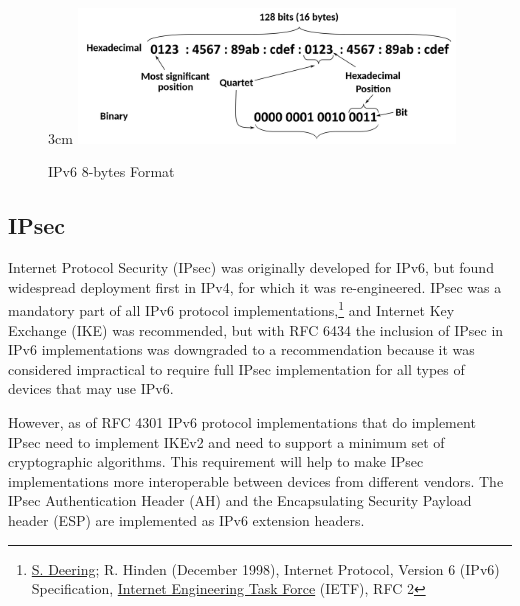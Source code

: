 \documentclass[a4paper,12pt]{book}
\begin{document}
\begin{figure}{3cm}
\centering
\includegraphics[width=10cm]{./IPv6.PNG}
\caption{IPv6 8-bytes Format }\label{wrap-fig:7}
\end{figure}


\subsection{IPsec}
Internet Protocol Security (IPsec) was originally developed for IPv6, but found widespread deployment first in IPv4, for which it was re-engineered. IPsec was a mandatory part of all IPv6 protocol implementations,\footnote{\label{note1}\href{https://en.wikipedia.org/wiki/Steve_Deering}{S. Deering}; R. Hinden (December 1998), Internet Protocol, Version 6 (IPv6) Specification, \href{https://en.wikipedia.org/wiki/Internet_Engineering_Task_Force}{Internet Engineering Task Force} (IETF), RFC 2} and Internet Key Exchange (IKE) was recommended, but with RFC 6434 the inclusion of IPsec in IPv6 implementations was downgraded to a recommendation because it was considered impractical to require full IPsec implementation for all types of devices that may use IPv6.

However, as of RFC 4301 IPv6 protocol implementations that do implement IPsec need to implement IKEv2 and need to support a minimum set of cryptographic algorithms. This requirement will help to make IPsec implementations more interoperable between devices from different vendors. The IPsec Authentication Header (AH) and the Encapsulating Security Payload header (ESP) are implemented as IPv6 extension headers.\footnotemark{}


\end{document}
